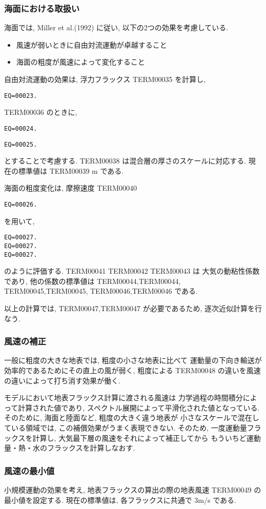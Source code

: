 \subsubsection{海面における取扱い}

海面では, Miller et al.(1992) に従い, 以下の2つの効果を考慮している.
\begin{itemize}
\item 風速が弱いときに自由対流運動が卓越すること
\item 海面の粗度が風速によって変化すること
\end{itemize}

自由対流運動の効果は, 浮力フラックス TERM00035 を計算し,
\begin{verbatim}
EQ=00023.
\end{verbatim}
TERM00036 のときに,
\begin{verbatim}
EQ=00024.
\end{verbatim}
\begin{verbatim}
EQ=00025.
\end{verbatim}
とすることで考慮する.  TERM00038 は混合層の厚さのスケールに対応する.
現在の標準値は TERM00039 m である.

海面の粗度変化は, 摩擦速度 TERM00040
\begin{verbatim}
EQ=00026.
\end{verbatim}
を用いて,
\begin{verbatim}
EQ=00027.
EQ=00027.
EQ=00027.
\end{verbatim}
のように評価する. TERM00041 TERM00042 TERM00043 は
大気の動粘性係数であり, 
他の係数の標準値は
TERM00044,TERM00044,
TERM00045,TERM00045,
TERM00046,TERM00046 である.

以上の計算では, TERM00047,TERM00047 が必要であるため,
逐次近似計算を行なう.

\subsubsection{風速の補正}

一般に粗度の大きな地表では, 粗度の小さな地表に比べて
運動量の下向き輸送が効率的であるためにその直上の風が弱く,
粗度による TERM00048 の違いを風速の違いによって打ち消す効果が働く.

モデルにおいて地表フラックス計算に渡される風速は
力学過程の時間積分によって計算された値であり,
スペクトル展開によって平滑化された値となっている.
そのために, 海面と陸面など, 粗度の大きく違う地表が
小さなスケールで混在している領域では, 
この補償効果がうまく表現できない.
そのため, 一度運動量フラックスを計算し,
大気最下層の風速をそれによって補正してから
もういちど運動量・熱・水のフラックスを計算しなおす.

\subsubsection{風速の最小値}

小規模運動の効果を考え,
地表フラックスの算出の際の地表風速
TERM00049 の最小値を設定する.
現在の標準値は, 各フラックスに共通で
3m/s である.

